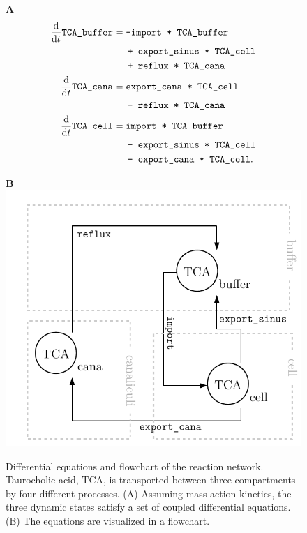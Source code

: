 \documentclass[article]{jss}
\begin{document}
\begin{figure}[ht]
	\centering
	\begin{minipage}{0.55\textwidth}
		\textbf{A}
		\begin{equation*}
			\begin{aligned}
				\frac{\rm d}{ {\rm d}t} \verb!TCA_buffer! &= \verb!-import * TCA_buffer!\\
				& \quad \verb! + export_sinus * TCA_cell!\\
				& \quad \verb! + reflux * TCA_cana!\\
				\frac{\rm d}{ {\rm d}t} \verb!TCA_cana! &= \verb!export_cana * TCA_cell!\\
				& \quad \verb! - reflux * TCA_cana!\\
				\frac{\rm d}{ {\rm d}t} \verb!TCA_cell! &= \verb!import * TCA_buffer!\\
				& \quad \verb! - export_sinus * TCA_cell!\\
				&\quad \verb! - export_cana * TCA_cell!.
			\end{aligned}
		\end{equation*}
	\end{minipage}
	\begin{minipage}{0.44\textwidth}
		\textbf{B}\\
	\includegraphics[width = \textwidth]{images/flowchart}
	\end{minipage}
	\caption{Differential equations and flowchart of the reaction network. Taurocholic acid,  TCA, is transported between three compartments by four different processes. (A) Assuming mass-action kinetics, the three dynamic states satisfy a set of coupled differential equations. (B) The equations are visualized in a flowchart. }
	\label{fig:flowchart}
\end{figure}
\end{document}
